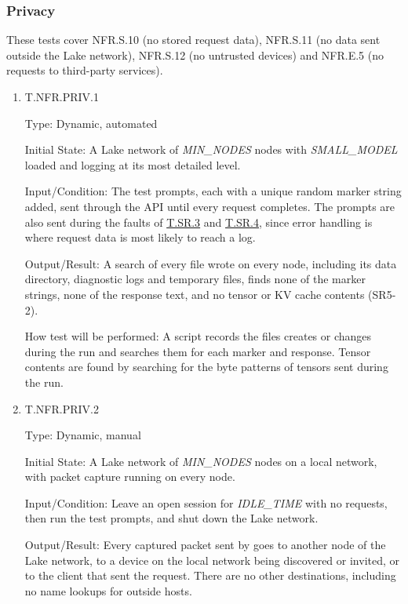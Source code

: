 \documentclass[12pt, titlepage]{article}
\begin{document}
\subsubsection{Privacy}

These tests cover NFR.S.10 (no stored request data), NFR.S.11 (no data sent
outside the Lake network), NFR.S.12 (no untrusted devices) and NFR.E.5 (no
requests to third-party services).

\begin{enumerate}

\item{T.NFR.PRIV.1\\}
\label{T.NFR.PRIV.1}

Type: Dynamic, automated

Initial State: A Lake network of \textit{MIN\_NODES} nodes with \textit{SMALL\_MODEL} loaded and
logging at its most detailed level.

Input/Condition: The test prompts, each with a unique random marker string
added, sent through the API until every request completes. The prompts are
also sent during the faults of \hyperref[T.SR.3]{T.SR.3} and
\hyperref[T.SR.4]{T.SR.4}, since error handling is where request
data is most likely to reach a log.

Output/Result: A search of every file \progname{} wrote on every node, including
its data directory, diagnostic logs and temporary files, finds none of the
marker strings, none of the response text, and no tensor or KV cache contents
(SR5-2).

How test will be performed: A script records the files \progname{} creates or
changes during the run and searches them for each marker and response. Tensor
contents are found by searching for the byte patterns of tensors sent during
the run.

\item{T.NFR.PRIV.2\\}
\label{T.NFR.PRIV.2}

Type: Dynamic, manual

Initial State: A Lake network of \textit{MIN\_NODES} nodes on a local network, with packet capture
running on every node.

Input/Condition: Leave an open session for \textit{IDLE\_TIME} with no
requests, then run the test prompts, and shut down the Lake network.

Output/Result: Every captured packet sent by \progname{} goes to another node of
the Lake network, to a device on the local network being discovered or invited,
or to the client that sent the request. There are no other destinations,
including no name lookups for outside hosts.


\end{enumerate}
\end{document}
